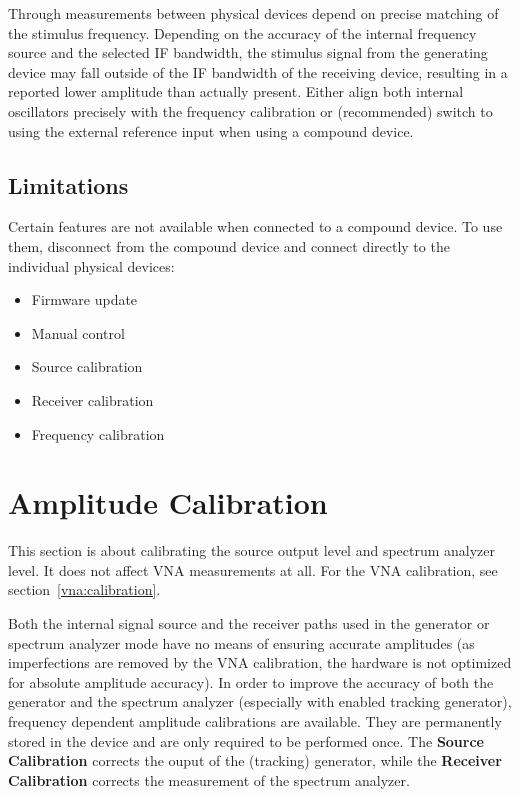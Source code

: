 \documentclass[a4paper,11pt]{article}
\newcommand\info[1][5ex]{%
  \renewcommand\stacktype{L}%
  \scaleto{\stackon[1.2pt]{\color{blue}$\bigcirc$}{\raisebox{-1.5pt}{\small i}}}{#1}%
}
\newenvironment{information}[1][]{%
   \begin{mdframed}[%
      backgroundcolor={blue!15}, hidealllines=true,
      skipabove=0.7\baselineskip, skipbelow=0.7\baselineskip,
      splitbottomskip=2pt, splittopskip=4pt, #1]%
   \makebox[0pt]{%
      \smash{%
         \hspace*{-45pt}%
         \raisebox{-5pt}{%
            {\info}%
         }%
      }%
   }%
}{\end{mdframed}}
\begin{document}
\begin{information}
Through measurements between physical devices depend on precise matching of the stimulus frequency. Depending on the accuracy of the internal frequency source and the selected IF bandwidth, the stimulus signal from the generating device may fall outside of the IF bandwidth of the receiving device, resulting in a reported lower amplitude than actually present. Either align both internal oscillators precisely with the frequency calibration or (recommended) switch to using the external reference input when using a compound device.
\end{information}

\subsection{Limitations}
Certain features are not available when connected to a compound device. To use them, disconnect from the compound device and connect directly to the individual physical devices:
\begin{itemize}
\item Firmware update
\item Manual control
\item Source calibration
\item Receiver calibration
\item Frequency calibration
\end{itemize}


\section{Amplitude Calibration}
\label{amplitude:calibration}
This section is about calibrating the source output level and spectrum analyzer level. It does not affect VNA measurements at all. For the VNA calibration, see section~\ref{vna:calibration}.

Both the internal signal source and the receiver paths used in the generator or spectrum analyzer mode have no means of ensuring accurate amplitudes (as imperfections are removed by the VNA calibration, the hardware is not optimized for absolute amplitude accuracy). In order to improve the accuracy of both the generator and the spectrum analyzer (especially with enabled tracking generator), frequency dependent amplitude calibrations are available. They are permanently stored in the device and are only required to be performed once. The \textbf{Source Calibration} corrects the ouput of the (tracking) generator, while the \textbf{Receiver Calibration} corrects the measurement of the spectrum analyzer.
\end{document}
